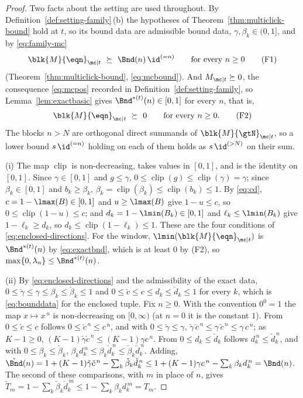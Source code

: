 \begin{proof}
Two facts about the setting are used throughout. By
Definition~\ref{def:setting-family}\,(b) the hypotheses of
Theorem~\ref{thm:multiclick-bound} hold at $t$, so its bound data are
admissible bound data, $\gamma,\beta_k\in(0,1]$, and by \eqref{eq:family-mc}
\begin{equation*}
  \blk{M}{\eqn}_{\mc|t}\ \succeq\ \Bnd(n)\,\id^{(=n)}\qquad\text{for every }n\ge0
  \tag{F1}
\end{equation*}
(Theorem~\ref{thm:multiclick-bound}, \eqref{eq:mcbound}). And
$M_{\mc|t}\succeq0$, the consequence \eqref{eq:mcpos} recorded in
Definition~\ref{def:setting-family}, so Lemma~\ref{lem:exactbasic} gives
$\Bnd^{\ast(t)}(n)\in[0,1]$ for every $n$, that is,
\begin{equation*}
  \blk{M}{\eqn}_{\mc|t}\ \succeq\ 0\qquad\text{for every }n\ge0 .
  \tag{F2}
\end{equation*}
The blocks $n>N$ are orthogonal direct summands of $\blk{M}{\gtN}_{\mc|t}$, so
a lower bound $s\,\id^{(=n)}$ holding on each of them holds as
$s\,\id^{(>N)}$ on their sum.

(i) The map $\operatorname{clip}$ is non-decreasing, takes values in
$[0,1]$, and is the identity on $[0,1]$. Since $\gamma\in[0,1]$ and
$g\le\gamma$, $0\le\operatorname{clip}(g)\le\operatorname{clip}(\gamma)=\gamma$;
since $\beta_k\in[0,1]$ and $b_k\ge\beta_k$,
$\beta_k=\operatorname{clip}(\beta_k)\le\operatorname{clip}(b_k)\le1$. By
\eqref{eq:cd}, $c=1-\lmax(B)\in[0,1]$ and $u\ge\lmax(B)$ give $1-u\le c$, so
$0\le\operatorname{clip}(1-u)\le c$; and $d_k=1-\lmin(B_k)\in[0,1]$ and
$\ell_k\le\lmin(B_k)$ give $1-\ell_k\ge d_k$, so
$d_k\le\operatorname{clip}(1-\ell_k)\le1$. These are the four conditions of
\eqref{eq:enclosed-directions}. For the window, $\lmin(\blk{M}{\eqn}_{\mc|t})$
is $\Bnd^{\ast(t)}(n)$ by \eqref{eq:exactbnd}, which is at least $0$ by (F2),
so $\max\{0,\lambda_n\}\le\Bnd^{\ast(t)}(n)$.

(ii) By \eqref{eq:enclosed-directions} and the admissibility of the exact data,
$0\le\check\gamma\le\gamma\le\beta_k\le\check\beta_k\le1$ and
$0\le\check c\le c\le d_k\le\check d_k\le1$ for every $k$, which is
\eqref{eq:bounddata} for the enclosed tuple. Fix $n\ge0$. With the convention
$0^0=1$ the map $x\mapsto x^{\,n}$ is non-decreasing on $[0,\infty)$ (at $n=0$
it is the constant $1$). From $0\le\check c\le c$ follows
$0\le\check c^{\,n}\le c^{\,n}$, and with $0\le\check\gamma\le\gamma$,
$\check\gamma\,\check c^{\,n}\le\gamma\,\check c^{\,n}\le\gamma\,c^{\,n}$; as
$K-1\ge0$, $(K-1)\check\gamma\check c^{\,n}\le(K-1)\gamma c^{\,n}$. From
$0\le d_k\le\check d_k$ follows $d_k^{\,n}\le\check d_k^{\,n}$, and with
$0\le\beta_k\le\check\beta_k$,
$\beta_kd_k^{\,n}\le\beta_k\check d_k^{\,n}\le\check\beta_k\check d_k^{\,n}$.
Adding, $\check\Bnd(n)=1+(K-1)\check\gamma\check c^{\,n}
-\sum_k\check\beta_k\check d_k^{\,n}\le1+(K-1)\gamma c^{\,n}
-\sum_k\beta_kd_k^{\,n}=\Bnd(n)$. The second of these comparisons, with $m$ in
place of $n$, gives $\check T_m=1-\sum_k\check\beta_k\check d_k^{\,m}
\le1-\sum_k\beta_kd_k^{\,m}=T_m$.


\end{proof}
